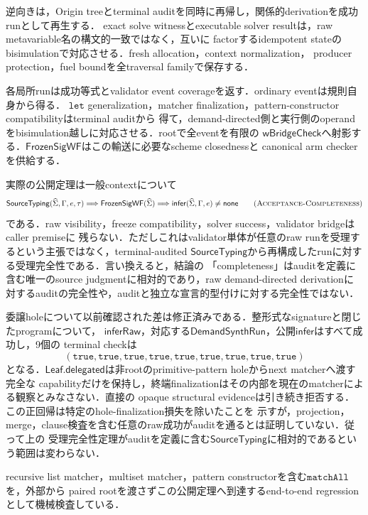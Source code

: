 逆向きは，Origin treeとterminal auditを同時に再帰し，関係的derivationを成功runとして再生する．
exact solve witnessとexecutable solver resultは，raw metavariable名の構文的一致ではなく，互いに
factorするidempotent stateのbisimulationで対応させる．fresh allocation，context normalization，
producer protection，fuel boundを全traversal familyで保存する．

各局所runは成功等式とvalidator event coverageを返す．ordinary eventは規則自身から得る．
$\mathtt{let}$ generalization，matcher finalization，pattern-constructor compatibilityはterminal auditから
得て，demand-directed側と実行側のoperandをbisimulation越しに対応させる．rootで全eventを有限の
$\mathsf{wBridgeCheck}$へ射影する．$\mathsf{FrozenSigWF}$はこの輸送に必要なscheme closednessと
canonical arm checkerを供給する．

実際の公開定理は一般contextについて
\[
\mathsf{SourceTyping}(\Sighat,\Gamma,e,\tau)
\Longrightarrow
\mathsf{FrozenSigWF}(\Sighat)
\Longrightarrow
\mathsf{infer}(\Sighat,\Gamma,e)\ne\mathsf{none}
\tag{\textsc{Acceptance-Completeness}}
\]
である．raw visibility，freeze compatibility，solver success，validator bridgeはcaller premiseに
残らない．ただしこれはvalidator単体が任意のraw runを受理するという主張ではなく，terminal-audited
$\mathsf{SourceTyping}$から再構成したrunに対する受理完全性である．言い換えると，結論の
「completeness」はauditを定義に含む唯一のsource judgmentに相対的であり，raw demand-directed derivationに
対するauditの完全性や，auditと独立な宣言的型付けに対する完全性ではない．

委譲holeについて以前確認された差は修正済みである．整形式なsignatureと閉じたprogramについて，
$\mathsf{inferRaw}$，対応する$\mathsf{DemandSynthRun}$，公開$\mathsf{infer}$はすべて成功し，9個の
terminal checkは
\[
(\mathtt{true},\mathtt{true},\mathtt{true},\mathtt{true},\mathtt{true},
 \mathtt{true},\mathtt{true},\mathtt{true},\mathtt{true})
\]
となる．$\mathsf{Leaf.delegated}$は非rootのprimitive-pattern holeからnext matcherへ渡す完全な
capabilityだけを保持し，終端finalizationはその内部を現在のmatcherによる観察とみなさない．直接の
opaque structural evidenceは引き続き拒否する．この正回帰は特定のhole-finalization損失を除いたことを
示すが，projection，merge，clause検査を含む任意のraw成功がauditを通るとは証明していない．従って上の
受理完全性定理がauditを定義に含む$\mathsf{SourceTyping}$に相対的であるという範囲は変わらない．

recursive list matcher，multiset matcher，pattern constructorを含む$\mathtt{matchAll}$を，外部から
paired rootを渡さずこの公開定理へ到達するend-to-end regressionとして機械検査している．

